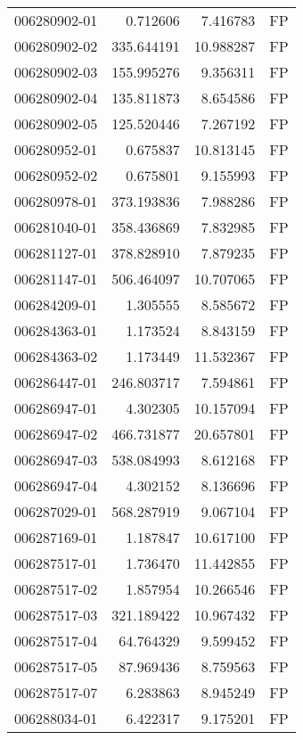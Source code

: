 \begin{tabular}{lrrl}
006280902-01 &    0.712606 &       7.416783 &   FP \\
006280902-02 &  335.644191 &      10.988287 &   FP \\
006280902-03 &  155.995276 &       9.356311 &   FP \\
006280902-04 &  135.811873 &       8.654586 &   FP \\
006280902-05 &  125.520446 &       7.267192 &   FP \\
006280952-01 &    0.675837 &      10.813145 &   FP \\
006280952-02 &    0.675801 &       9.155993 &   FP \\
006280978-01 &  373.193836 &       7.988286 &   FP \\
006281040-01 &  358.436869 &       7.832985 &   FP \\
006281127-01 &  378.828910 &       7.879235 &   FP \\
006281147-01 &  506.464097 &      10.707065 &   FP \\
006284209-01 &    1.305555 &       8.585672 &   FP \\
006284363-01 &    1.173524 &       8.843159 &   FP \\
006284363-02 &    1.173449 &      11.532367 &   FP \\
006286447-01 &  246.803717 &       7.594861 &   FP \\
006286947-01 &    4.302305 &      10.157094 &   FP \\
006286947-02 &  466.731877 &      20.657801 &   FP \\
006286947-03 &  538.084993 &       8.612168 &   FP \\
006286947-04 &    4.302152 &       8.136696 &   FP \\
006287029-01 &  568.287919 &       9.067104 &   FP \\
006287169-01 &    1.187847 &      10.617100 &   FP \\
006287517-01 &    1.736470 &      11.442855 &   FP \\
006287517-02 &    1.857954 &      10.266546 &   FP \\
006287517-03 &  321.189422 &      10.967432 &   FP \\
006287517-04 &   64.764329 &       9.599452 &   FP \\
006287517-05 &   87.969436 &       8.759563 &   FP \\
006287517-07 &    6.283863 &       8.945249 &   FP \\
006288034-01 &    6.422317 &       9.175201 &   FP \\

\end{tabular}
